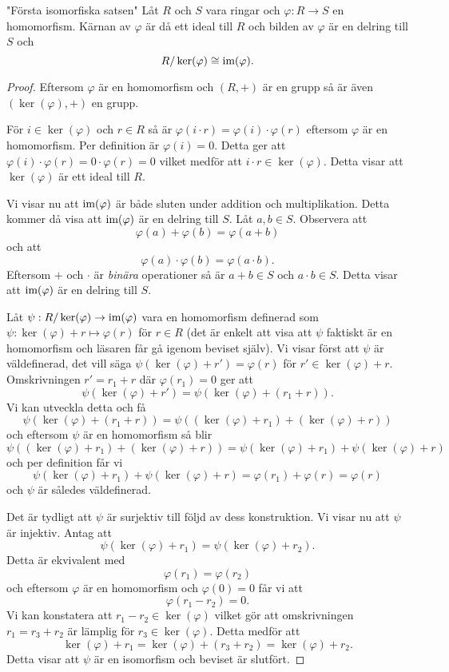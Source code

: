 \documentclass{article}
\newcommand{\im}[0]{\textnormal{im}}
\theoremstyle{definition}
\begin{document}
\hypertarget{isomorfiska}{}
\begin{mytheo}{"Första isomorfiska satsen"}{}
  Låt $R$ och $S$ vara ringar och $\varphi: R \rightarrow S$ en homomorfism. Kärnan av $\varphi$ är då ett ideal till $R$ och bilden av $\varphi$ är en 
  delring till $S$ och 
  \[R/ \ker(\varphi) \cong \im(\varphi).\]
\end{mytheo}
\begin{proof}
  Eftersom $\varphi$ är en homomorfism och $(R, +)$ är en grupp så är även $(\ker(\varphi), +)$ en grupp. 

  För $i \in \ker(\varphi)$ och $r \in R$ så är $\varphi(i \cdot r) = \varphi(i) \cdot \varphi(r)$ eftersom $\varphi$ är en homomorfism. 
  Per definition är $\varphi(i) = 0$. Detta ger att $\varphi(i) \cdot \varphi(r) = 0 \cdot \varphi(r) = 0$ vilket medför att $i \cdot r \in \ker(\varphi)$.
  Detta visar att $\ker(\varphi)$ är ett ideal till $R$.

  Vi visar nu att $\im(\varphi)$ är både sluten under addition och multiplikation. Detta kommer då visa att $\im(\varphi)$ är en delring till $S$.
  Låt $a, b \in S$. Observera att 
  \[\varphi(a) + \varphi(b) = \varphi(a + b)\]
  och att 
  \[\varphi(a) \cdot \varphi(b) = \varphi(a \cdot b).\]
  Eftersom $+$ och $\cdot$ är \textit{binära} operationer så är $a + b \in S$ och $a \cdot b \in S$. Detta visar att $\im(\varphi)$ är en delring till $S$.

  Låt $\psi: R/ \ker(\varphi) \rightarrow \im(\varphi)$ vara en homomorfism definerad som $\psi: \ker(\varphi) + r \mapsto \varphi(r)$ för $r \in R$ 
  (det är enkelt att visa att $\psi$ faktiskt är en homomorfism och läsaren får gå igenom beviset själv). Vi visar först 
  att $\psi$ är väldefinerad, det vill säga $\psi(\ker(\varphi) + r') = \varphi(r)$ för $r' \in \ker(\varphi) + r.$ Omskrivningen 
  $r' = r_1 + r$ där $\varphi(r_1) = 0$ ger att 
  \[\psi(\ker(\varphi) + r') = \psi(\ker(\varphi) + (r_1+r)).\]
  Vi kan utveckla detta och få
  \[\psi(\ker(\varphi) + (r_1+r)) = \psi((\ker(\varphi) + r_1) + (\ker(\varphi) + r))\]
  och eftersom $\psi$ är en homomorfism så blir 
  \[\psi((\ker(\varphi) + r_1) + (\ker(\varphi) + r)) = \psi(\ker(\varphi) + r_1) + \psi(\ker(\varphi) + r)\]
  och per definition får vi
  \[\psi(\ker(\varphi) + r_1) + \psi(\ker(\varphi) + r) = \varphi(r_1) + \varphi(r) = \varphi(r)\]
  och $\psi$ är således väldefinerad.

  Det är tydligt att $\psi$ är surjektiv till följd av dess konstruktion. Vi visar nu att $\psi$ är injektiv. Antag att 
  \[\psi(\ker(\varphi) + r_1) = \psi(\ker(\varphi) + r_2).\]
  Detta är ekvivalent med 
  \[\varphi(r_1) = \varphi(r_2)\]
  och eftersom $\varphi$ är en homomorfism och $\varphi(0) = 0$ får vi att 
  \[\varphi(r_1 - r_2) = 0.\]
  Vi kan konstatera att $r_1 - r_2 \in \ker(\varphi)$ vilket gör att omskrivningen $r_1 = r_3 + r_2$ är lämplig för $r_3 \in \ker(\varphi)$.
  Detta medför att 
  \[\ker(\varphi) + r_1 = \ker(\varphi) + (r_3 + r_2) = \ker(\varphi) + r_2.\]
  Detta visar att $\psi$ är en isomorfism och beviset är slutfört.
\end{proof}
\end{document}
